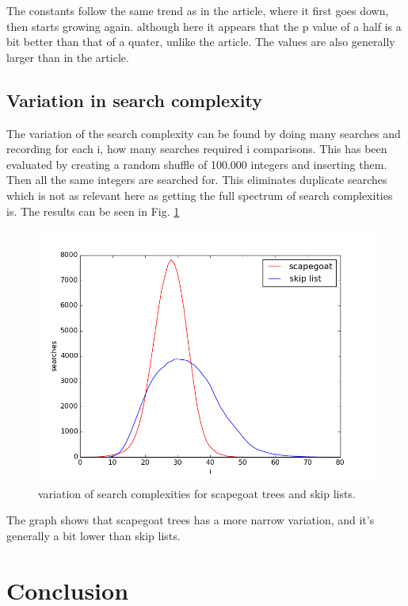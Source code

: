 \documentclass[12pt, a4paper]{article}
\begin{document}
\medskip


The constants follow the same trend as in the article, where it first goes down, then starts growing again. although here it appears that the 
p value of a half is a bit better than that of a quater, unlike the article. The values are also generally larger than in the article.


\subsection*{Variation in search complexity}
The variation of the search complexity can be found by doing many searches and recording for each i, how many searches required i comparisons.
This has been evaluated by creating a random shuffle of 100.000 integers and inserting them. Then all the same integers are searched for.
This eliminates duplicate searches which is not as relevant here as getting the full spectrum of search complexities is. The results 
can be seen in Fig. \ref{variation}

\begin{figure}[H]
    \centering
    \includegraphics[width=1\textwidth]{variation.png}
    \caption{variation of search complexities for scapegoat trees and skip lists.}
    \label{variation}
\end{figure}

The graph shows that scapegoat trees has a more narrow variation, and it's generally a bit lower than skip lists.




\section*{Conclusion}
\end{document}
